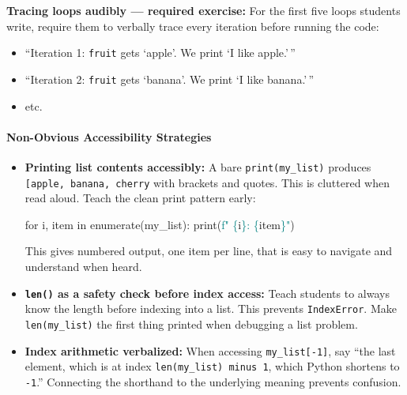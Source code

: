 \documentclass[
  justified,
  openright,
]{tufte-book}
\let\paragraph\paragraph
\newcommand{\BuiltInTok}[1]{#1}
\newcommand{\ControlFlowTok}[1]{\textcolor{BrandBlue}{#1}}
\newcommand{\KeywordTok}[1]{\textcolor{BrandBlue}{#1}}
\newcommand{\NormalTok}[1]{#1}
\newcommand{\SpecialCharTok}[1]{\textcolor{Teal}{#1}}
\newcommand{\SpecialStringTok}[1]{\textcolor{Teal}{#1}}
\newenvironment{Shaded}{%
  \begin{snugshade}
}{%
  \end{snugshade}
}
\let\paragraph\paragraph
\providecommand{\tightlist}{%
  \setlength{\itemsep}{0pt}\setlength{\parskip}{0pt}}
\begin{document}
\textbf{Tracing loops audibly --- required exercise:} For the first five
loops students write, require them to verbally trace every iteration
before running the code:

\begin{itemize}
\tightlist
\item
  ``Iteration 1: \texttt{fruit} gets `apple'. We print `I like
  apple.'\,''
\item
  ``Iteration 2: \texttt{fruit} gets `banana'. We print `I like
  banana.'\,''
\item
  etc.
\end{itemize}

\paragraph{Non-Obvious Accessibility
Strategies}\label{non-obvious-accessibility-strategies-1}

\begin{itemize}
\item
  \textbf{Printing list contents accessibly:} A bare
  \texttt{print(my\_list)} produces
  \texttt{{[}\textquotesingle{}apple\textquotesingle{},\ \textquotesingle{}banana\textquotesingle{},\ \textquotesingle{}cherry\textquotesingle{}{]}}
  with brackets and quotes. This is cluttered when read aloud. Teach the
  clean print pattern early:

\begin{Shaded}
\begin{Highlighting}[]
\ControlFlowTok{for}\NormalTok{ i, item }\KeywordTok{in} \BuiltInTok{enumerate}\NormalTok{(my\_list):}
    \BuiltInTok{print}\NormalTok{(}\SpecialStringTok{f"  }\SpecialCharTok{\{}\NormalTok{i}\SpecialCharTok{\}}\SpecialStringTok{: }\SpecialCharTok{\{}\NormalTok{item}\SpecialCharTok{\}}\SpecialStringTok{"}\NormalTok{)}
\end{Highlighting}
\end{Shaded}

  This gives numbered output, one item per line, that is easy to
  navigate and understand when heard.
\item
  \textbf{\texttt{len()} as a safety check before index access:} Teach
  students to always know the length before indexing into a list. This
  prevents \texttt{IndexError}. Make \texttt{len(my\_list)} the first
  thing printed when debugging a list problem.
\item
  \textbf{Index arithmetic verbalized:} When accessing
  \texttt{my\_list{[}-1{]}}, say ``the last element, which is at index
  \texttt{len(my\_list)\ minus\ 1}, which Python shortens to
  \texttt{-1}.'' Connecting the shorthand to the underlying meaning
  prevents confusion.
\end{itemize}
\end{document}
